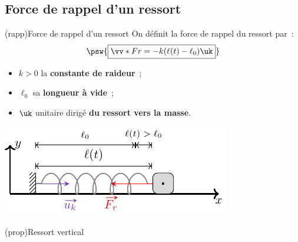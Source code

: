 \documentclass[../../main/main.tex]{subfiles}
\begin{document}
\subsection{Force de rappel d'un ressort}

\begin{tcb*}[sidebyside, righthand ratio=.45](rapp){Force de rappel d'un ressort}
	On définit la force de rappel du ressort par~:
	\begin{equation*}
		\psw{\boxed{\vv*{F}{r} = - k(\ell(t) - \ell_0)\uk}}
	\end{equation*}
	\begin{itemize}
		\item $k > 0$ la \textbf{constante de raideur}~;
		\item $\ell_0$ sa \textbf{longueur à vide}~;
		\item $\uk$ unitaire dirigé \textbf{du ressort vers la masse}.
	\end{itemize}
	\tcblower
	\begin{center}
		\includegraphics[width=\linewidth]{ressort_def-cpct}
	\end{center}
\end{tcb*}


\begin{tcb*}[sidebyside](prop){Ressort vertical}
	\psw{%
		\[
			\boxed{\ell\ind{eq} = \ell_0 + \frac{mg}{k}}
		\]
	}%
	\tcblower
	\psw{%
		\[
			\boxed{\zpp(t) + \w_0{}^2 z(t) = -\w_0{}^2 \ell\ind{eq}}
		\]
	}%
\end{tcb*}
\end{document}
